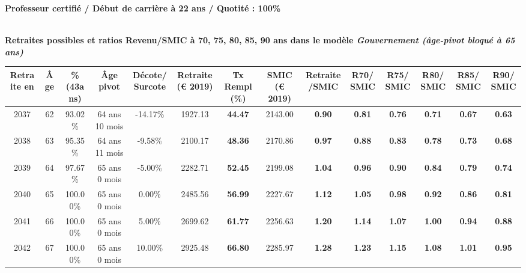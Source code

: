 {\bf \noindent Professeur certifié / Début de carrière à 22 ans / Quotité : 100\%}  ~ 

 ~\\{\bf \noindent Retraites possibles et ratios Revenu/SMIC à 70, 75, 80, 85, 90 ans dans le modèle \emph{Gouvernement (âge-pivot bloqué à 65 ans)}}  
 
\begin{adjustbox}{max width=\textwidth} 
\begin{tabular}[htb]{|c|c||c|c|c||c|c||c|c||c|c|c|c|c|} 
\hline 
 Retraite en &  Âge &  \%(43ans) &  Âge pivot &  Décote/Surcote &  Retraite (\euro{} 2019) &  Tx Rempl(\%) &  SMIC (\euro{} 2019) &  Retraite/SMIC &  R70/SMIC &  R75/SMIC &  R80/SMIC &  R85/SMIC &  R90/SMIC \\ 
\hline \hline 
 2037 &  62 &  93.02\% &  64 ans 10 mois &  -14.17\% &  1927.13 &  {\bf 44.47} &  2143.00 &  {\bf {\color{red} 0.90}} &  {\bf {\color{red} 0.81}} &  {\bf {\color{red} 0.76}} &  {\bf {\color{red} 0.71}} &  {\bf {\color{red} 0.67}} &  {\bf {\color{red} 0.63}} \\ 
\hline 
 2038 &  63 &  95.35\% &  64 ans 11 mois &  -9.58\% &  2100.17 &  {\bf 48.36} &  2170.86 &  {\bf {\color{red} 0.97}} &  {\bf {\color{red} 0.88}} &  {\bf {\color{red} 0.83}} &  {\bf {\color{red} 0.78}} &  {\bf {\color{red} 0.73}} &  {\bf {\color{red} 0.68}} \\ 
\hline 
 2039 &  64 &  97.67\% &  65 ans 0 mois &  -5.00\% &  2282.71 &  {\bf 52.45} &  2199.08 &  {\bf 1.04} &  {\bf {\color{red} 0.96}} &  {\bf {\color{red} 0.90}} &  {\bf {\color{red} 0.84}} &  {\bf {\color{red} 0.79}} &  {\bf {\color{red} 0.74}} \\ 
\hline 
 2040 &  65 &  100.00\% &  65 ans 0 mois &  0.00\% &  2485.56 &  {\bf 56.99} &  2227.67 &  {\bf 1.12} &  {\bf 1.05} &  {\bf {\color{red} 0.98}} &  {\bf {\color{red} 0.92}} &  {\bf {\color{red} 0.86}} &  {\bf {\color{red} 0.81}} \\ 
\hline 
 2041 &  66 &  100.00\% &  65 ans 0 mois &  5.00\% &  2699.62 &  {\bf 61.77} &  2256.63 &  {\bf 1.20} &  {\bf 1.14} &  {\bf 1.07} &  {\bf {\color{red} 1.00}} &  {\bf {\color{red} 0.94}} &  {\bf {\color{red} 0.88}} \\ 
\hline 
 2042 &  67 &  100.00\% &  65 ans 0 mois &  10.00\% &  2925.48 &  {\bf 66.80} &  2285.97 &  {\bf 1.28} &  {\bf 1.23} &  {\bf 1.15} &  {\bf 1.08} &  {\bf 1.01} &  {\bf {\color{red} 0.95}} \\ 
\hline 
\hline 
\end{tabular} 
\end{adjustbox} 
 
